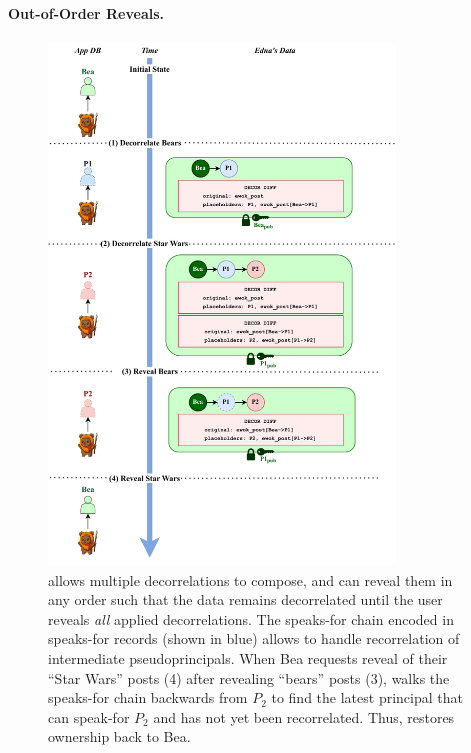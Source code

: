 %
%

\paragraph{Out-of-Order Reveals.}
\label{s:design:oooreveals}

\begin{figure}
\centering
    \includegraphics[width=0.82\textwidth]{figs/composition}
    \caption[Decorrelations can compose and be revealed in any order.]
    {\small \sys allows multiple decorrelations to compose, and can reveal them in
    any order such that the data remains decorrelated until the user reveals \emph{all}
    applied decorrelations. The speaks-for chain encoded in
    speaks-for records (shown in blue) allows \sys to handle recorrelation of intermediate
    pseudoprincipals. When Bea requests reveal of their ``Star Wars''
    posts (4) after revealing ``bears'' posts (3), \sys walks the speaks-for chain
    backwards from $P_2$ to find the latest principal that can speak-for $P_2$
    and has not yet been recorrelated. Thus, \sys restores ownership back to
    Bea.}
\label{f:composition-desn}
\end{figure}


